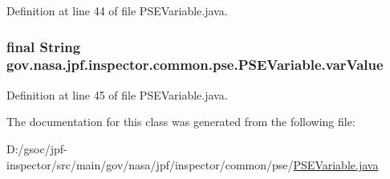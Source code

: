Definition at line 44 of file P\+S\+E\+Variable.\+java.

\subsubsection[{\texorpdfstring{var\+Value}{varValue}}]{\setlength{\rightskip}{0pt plus 5cm}final String gov.\+nasa.\+jpf.\+inspector.\+common.\+pse.\+P\+S\+E\+Variable.\+var\+Value\hspace{0.3cm}{\ttfamily [private]}}\hypertarget{classgov_1_1nasa_1_1jpf_1_1inspector_1_1common_1_1pse_1_1_p_s_e_variable_a898c9a245ba0da48961a76a29c8ee8b3}{}\label{classgov_1_1nasa_1_1jpf_1_1inspector_1_1common_1_1pse_1_1_p_s_e_variable_a898c9a245ba0da48961a76a29c8ee8b3}


Definition at line 45 of file P\+S\+E\+Variable.\+java.



The documentation for this class was generated from the following file\+:\begin{DoxyCompactItemize}
\item 
D\+:/gsoc/jpf-\/inspector/src/main/gov/nasa/jpf/inspector/common/pse/\hyperlink{_p_s_e_variable_8java}{P\+S\+E\+Variable.\+java}\end{DoxyCompactItemize}
